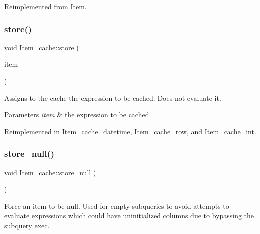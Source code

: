 Reimplemented from \mbox{\hyperlink{classItem_aa7ba4bde739d83adec8edf3bf1596d94}{Item}}.

\mbox{\label{classItem__cache_a89d0134e0a71238cb6fa7a32a23f88e7}} 
\subsubsection{\texorpdfstring{store()}{store()}}
{\footnotesize\ttfamily void Item\+\_\+cache\+::store (\begin{DoxyParamCaption}\item[{\mbox{\hyperlink{classItem}{Item}} $\ast$}]{item }\end{DoxyParamCaption})\hspace{0.3cm}{\ttfamily [virtual]}}

Assigns to the cache the expression to be cached. Does not evaluate it. 
\begin{DoxyParams}{Parameters}
{\em item} & the expression to be cached \\
\hline
\end{DoxyParams}


Reimplemented in \mbox{\hyperlink{classItem__cache__datetime_a75bbda93393db797f710521aabd9200c}{Item\+\_\+cache\+\_\+datetime}}, \mbox{\hyperlink{classItem__cache__row_aa782d678a13a494afe3882ced878ee7c}{Item\+\_\+cache\+\_\+row}}, and \mbox{\hyperlink{classItem__cache__int_a657ce32793e936e705bf43fde85a2da4}{Item\+\_\+cache\+\_\+int}}.

\mbox{\label{classItem__cache_a49635825d6d757e8500936cb7d3665a5}} 
\subsubsection{\texorpdfstring{store\+\_\+null()}{store\_null()}}
{\footnotesize\ttfamily void Item\+\_\+cache\+::store\+\_\+null (\begin{DoxyParamCaption}{ }\end{DoxyParamCaption})\hspace{0.3cm}{\ttfamily [inline]}}

Force an item to be null. Used for empty subqueries to avoid attempts to evaluate expressions which could have uninitialized columns due to bypassing the subquery exec. \mbox{\label{classItem__cache_a38750db48a153247ba0b65b6674f11b4}} 
